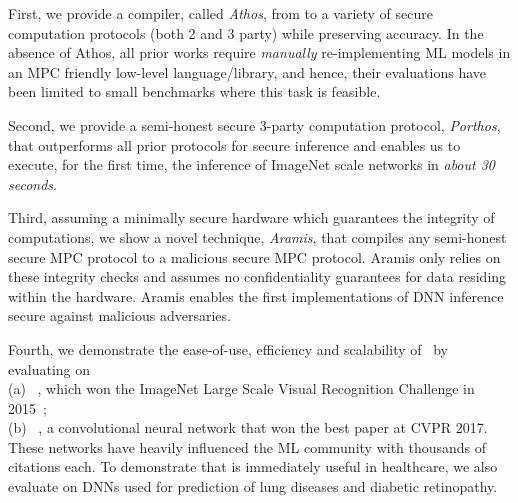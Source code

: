 \begin{tiret}

\item First, we provide a compiler, called {\em Athos}, from
  \tensorflow to a variety of secure computation protocols (both 2 and
  3 party) while preserving accuracy. In the absence of Athos, all prior works require {\em
    manually} re-implementing ML models in an MPC friendly low-level
  language/library, and hence, their evaluations have been limited to
 small benchmarks where this task is feasible.


\item Second, we provide a semi-honest secure 3-party computation protocol, {\em Porthos}, that outperforms all prior protocols for secure inference and enables us to execute, 
for the first time, the inference of ImageNet scale networks in {\em about 30 seconds}.

\item Third, assuming a minimally secure hardware  which guarantees
  the integrity of computations,  we show a novel technique, {\em
    Aramis}, that compiles any semi-honest secure MPC protocol to a malicious
  secure MPC protocol.
Aramis only relies on these integrity checks and assumes no confidentiality
guarantees for data residing within the hardware. 
Aramis
enables the first
implementations of DNN inference secure against malicious
adversaries.


\item Fourth, we demonstrate the ease-of-use, efficiency and scalability of \cryptflow\ by evaluating on  \\ (a) \resnet~\cite{resnet}, which won the ImageNet Large Scale Visual Recognition Challenge in 2015~\cite{imagenet}; \\ (b) \densenet~\cite{densenet}, a convolutional neural network that won the best paper at CVPR 2017.\\
\noindent 
These
 networks have heavily influenced the ML community with thousands of
 citations each. To demonstrate that \tool  is immediately useful in
 healthcare, we  also evaluate \tool on DNNs used for prediction of
 lung diseases and diabetic retinopathy.


\end{tiret}

